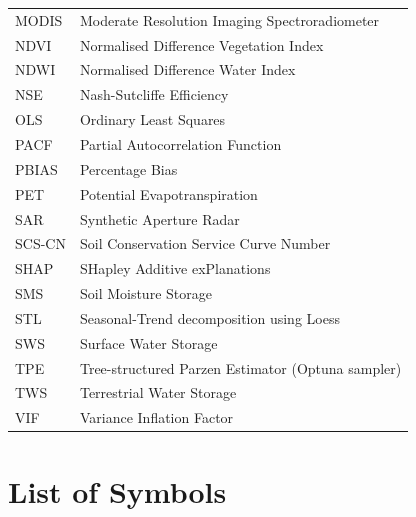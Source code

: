 \documentclass[12pt,a4paper,oneside]{report}
\begin{document}
\begin{longtable}{ll}
  MODIS   & Moderate Resolution Imaging Spectroradiometer \\
  NDVI    & Normalised Difference Vegetation Index \\
  NDWI    & Normalised Difference Water Index \\
  NSE     & Nash-Sutcliffe Efficiency \\
  OLS     & Ordinary Least Squares \\
  PACF    & Partial Autocorrelation Function \\
  PBIAS   & Percentage Bias \\
  PET     & Potential Evapotranspiration \\
  SAR     & Synthetic Aperture Radar \\
  SCS-CN  & Soil Conservation Service Curve Number \\
  SHAP    & SHapley Additive exPlanations \\
  SMS     & Soil Moisture Storage \\
  STL     & Seasonal-Trend decomposition using Loess \\
  SWS     & Surface Water Storage \\
  TPE     & Tree-structured Parzen Estimator (Optuna sampler) \\
  TWS     & Terrestrial Water Storage \\
  VIF     & Variance Inflation Factor \\
\end{longtable}

\newpage
\chapter*{List of Symbols}
\end{document}
